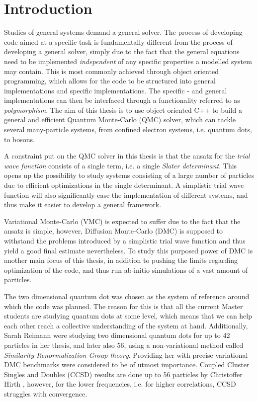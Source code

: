 \chapter{Introduction}

Studies of general systems demand a general solver. The process of developing code aimed at a specific task is fundamentally different from the process of developing a general solver, simply due to the fact that the general equations need to be implemented \textit{independent} of any specific properties a modelled system may contain. This is most commonly achieved through object oriented programming, which allows for the code to be structured into general implementations and specific implementations. The specific - and general implementations can then be interfaced through a functionality referred to as \textit{polymorphism}. The aim of this thesis is to use object oriented C++ to build a general and efficient Quantum Monte-Carlo (QMC) solver, which can tackle several many-particle systems, from confined electron systems, i.e. quantum dots, to bosons.  

A constraint put on the QMC solver in this thesis is that the ansatz for the \textit{trial wave function} consists of a single term, i.e. a single \textit{Slater determinant}. This opens up the possibility to study systems consisting of a large number of particles due to efficient optimizations in the single determinant. A simplistic trial wave function will also  significantly ease the implementation of different systems, and thus make it easier to develop a general framework. 

Variational Monte-Carlo (VMC) is expected to suffer due to the fact that the ansatz is simple, however,  Diffusion Monte-Carlo (DMC) is supposed to withstand the problems introduced by a simplistic trial wave function and thus yield a good final estimate nevertheless. To study this purposed power of DMC is another main focus of this thesis, in addition to pushing the limits regarding optimization of the code, and thus run ab-initio simulations of a vast amount of particles.

The two dimensional quantum dot was chosen as the system of reference around which the code was planned. The reason for this is that all the current Master students are studying quantum dots at some level, which means that we can help each other reach a collective understanding of the system at hand. Additionally, Sarah Reimann were studying two dimensional quantum dots for up to 42 particles in her thesis, and later also 56, using a non-variational method called \textit{Similarity Renormalization Group theory}. Providing her with precise variational DMC benchmarks were considered to be of utmost importance. Coupled Cluster Singles and Doubles (CCSD) results are done up to 56 particles by Christoffer Hirth \cite{Hirth}, however, for the lower frequencies, i.e. for higher correlations, CCSD struggles with convergence.   

